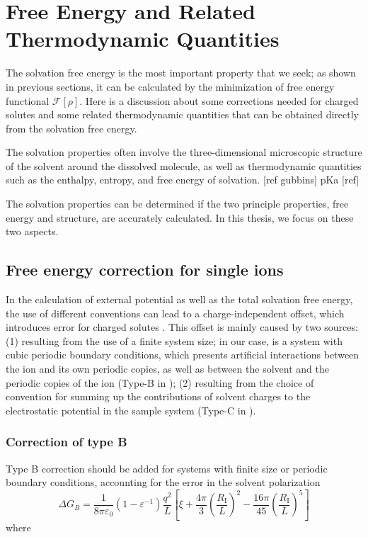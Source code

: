 
\chapter{Free Energy and Related Thermodynamic Quantities\label{chpt:thermodynamic-quantities}}

The solvation free energy is the most important property that we seek;
as shown in previous sections, it can be calculated by the minimization
of free energy functional $\mathcal{F}[\rho]$. Here is a discussion
about some corrections needed for charged solutes and some related
thermodynamic quantities that can be obtained directly from the solvation
free energy.

The solvation properties often involve the three-dimensional microscopic
structure of the solvent around the dissolved molecule, as well as
thermodynamic quantities such as the enthalpy, entropy, and free energy
of solvation. {[}ref gubbins{]} pKa {[}ref{]}

The solvation properties can be determined if the two principle properties,
free energy and structure, are accurately calculated. In this thesis,
we focus on these two aspects.


\section{Free energy correction for single ions}

In the calculation of external potential as well as the total solvation
free energy, the use of different conventions can lead to a charge-independent
offset, which introduces error for charged solutes \citep{Kastenholz_2006_I,Kastenholz_2006_II,Hunenberger_book}.
This offset is mainly caused by two sources: (1) resulting from the
use of a finite system size; in our case, is a system with cubic periodic
boundary conditions, which presents artificial interactions between
the ion and its own periodic copies, as well as between the solvent
and the periodic copies of the ion (Type-B in \citep{Kastenholz_2006_II});
(2) resulting from the choice of convention for summing up the contributions
of solvent charges to the electrostatic potential in the sample system
(Type-C in \citep{Kastenholz_2006_II}).


\subsection{Correction of type B}

Type B correction should be added for systems with finite size or
periodic boundary conditions, accounting for the error in the solvent
polarization 
\begin{equation}
\Delta G_{B}=\frac{1}{8\pi\varepsilon_{0}}\left(1-\varepsilon^{-1}\right)\frac{q^{2}}{L}\left[\xi+\frac{4\pi}{3}\left(\frac{R_{\mathrm{I}}}{L}\right)^{2}-\frac{16\pi}{45}\left(\frac{R_{\mathrm{I}}}{L}\right)^{5}\right]\label{eq:corr-B}
\end{equation}
where

